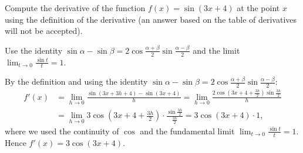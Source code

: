 
\begin{question}
Compute the derivative of the function $f(x)=\sin(3x+4)$ at the point $x$ using the definition of the derivative (an answer based on the table of derivatives will not be accepted).
\end{question}

\begin{hint}
Use the identity $\sin\alpha-\sin\beta=2\cos\frac{\alpha+\beta}{2}\sin\frac{\alpha-\beta}{2}$ and the limit $\lim_{t\to0}\frac{\sin t}{t}=1$.
\end{hint}

\begin{solution}
By the definition and using the identity $\sin\alpha-\sin\beta=2\cos\frac{\alpha+\beta}{2}\sin\frac{\alpha-\beta}{2}$:
\begin{align*}
f'(x)&=\lim_{h\to0}\frac{\sin(3x+3h+4)-\sin(3x+4)}{h}
=\lim_{h\to0}\frac{2\cos\!\left(3x+4+\frac{3h}{2}\right)\sin\frac{3h}{2}}{h}\\
&=\lim_{h\to0}3\cos\!\left(3x+4+\tfrac{3h}{2}\right)\cdot\frac{\sin\frac{3h}{2}}{\frac{3h}{2}}=3\cos(3x+4)\cdot1,
\end{align*}
where we used the continuity of $\cos$ and the fundamental limit $\lim_{t\to0}\frac{\sin t}{t}=1$. Hence $f'(x)=3\cos(3x+4)$.
\end{solution}
